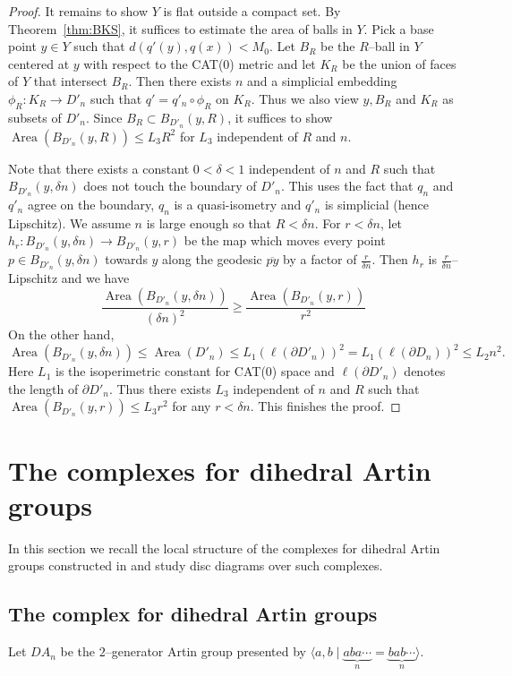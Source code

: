 \documentclass[11pt]{amsart}
\newcommand{\area}{\operatorname{Area}}
\theoremstyle{definition}
\newcommand{\angled}[1]{\langle#1\rangle}
\begin{document}
\begin{proof}
It remains to show $Y$ is flat outside a compact set. By Theorem~\ref{thm:BKS}, it suffices to estimate the area of balls in $Y$. Pick a base point $y\in Y$ such that $d(q'(y),q(x))<M_0$. Let $B_R$ be the $R$--ball in $Y$ centered at $y$ with respect to the CAT(0) metric and let $K_R$ be the union of faces of $Y$ that intersect $B_R$. Then there exists $n$ and a simplicial embedding $\phi_R\colon K_R\to D'_n$ such that $q'=q'_n\circ \phi_R$ on $K_R$. Thus we also view $y,B_R$ and $K_R$ as subsets of $D'_n$. Since  $B_R\subset B_{D'_n}(y,R)$, it suffices to show $\area(B_{D'_n}(y,R))\le L_3 R^2$ for $L_3$ independent of $R$ and $n$.

Note that there exists a constant $0<\delta<1$ independent of $n$ and $R$ such that $B_{D'_n}(y,\delta n)$ does not touch the boundary of $D'_n$. This uses the fact that $q_n$ and $q'_n$ agree on the boundary, $q_n$ is a quasi-isometry and $q'_n$ is simplicial (hence Lipschitz). We assume $n$ is large enough so that $R<\delta n$. For $r<\delta n$, let $h_r\colon B_{D'_n}(y,\delta n)\to B_{D'_n}(y,r)$ be the map which moves every point $p\in B_{D'_n}(y,\delta n)$ towards $y$ along the geodesic $\overline{py}$ by a factor of $\frac{r}{\delta n}$. Then $h_r$ is $\frac{r}{\delta n}$--Lipschitz and we have
\begin{equation*}
\frac{\area(B_{D'_n}(y,\delta n))}{(\delta n)^2}\ge \frac{\area(B_{D'_n}(y,r))}{r^2}
\end{equation*}
On the other hand, 
$$\area(B_{D'_n}(y,\delta n))\le\area(D'_n)\le L_1(\ell(\partial D'_n))^2=L_1(\ell(\partial D_n))^2\le L_2 n^2.$$
Here $L_1$ is the isoperimetric constant for CAT(0) space and $\ell(\partial D'_n)$ denotes the length of $\partial D'_n$. Thus there exists $L_3$ independent of $n$ and $R$ such that $\area(B_{D'_n}(y,r))\le L_3 r^2$ for any $r<\delta n$. This finishes the proof.
\end{proof}

\section{The complexes for dihedral Artin groups}
\label{sec:geometric model}

In this section we recall the local structure of the complexes for dihedral Artin groups constructed in \cite{Artinmetric} and study disc diagrams over such complexes.
\subsection{The complex for dihedral Artin groups}
\label{subsec:precells}
Let $DA_n$ be the $2$--generator Artin group presented by $\angled{a,b\mid \underbrace{aba\cdots}_{n} =
	\underbrace{bab\cdots}_n}$.
\end{document}

